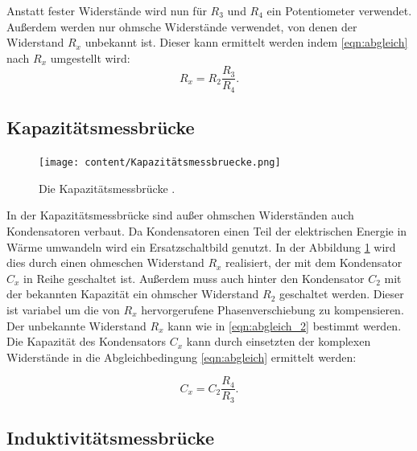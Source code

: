 Anstatt fester Widerstände wird nun für $R_3$ und $R_4$ ein Potentiometer verwendet.
Außerdem werden nur ohmsche Widerstände verwendet, von denen der Widerstand $R_x$ unbekannt ist.
Dieser kann ermittelt werden indem \eqref{eqn:abgleich} nach $R_x$ umgestellt wird:
\begin{equation}
    R_x = R_2 \frac{R_3}{R_4}.
    \label{eqn:abgleich_2}
\end{equation}

\subsection{Kapazitätsmessbrücke}

\begin{figure}
    \centering
    \texttt{[image: content/Kapazitätsmessbruecke.png]}
    \caption{Die Kapazitätsmessbrücke \cite[S. 220]{anleitung}.}
     \label{fig:kapaz}
\end{figure}

In der Kapazitätsmessbrücke sind außer ohmschen Widerständen auch Kondensatoren verbaut.
Da Kondensatoren einen Teil der elektrischen Energie in Wärme umwandeln wird ein Ersatzschaltbild genutzt.
In der Abbildung \ref{fig:kapaz} wird dies durch einen ohmeschen Widerstand $R_x$ realisiert, der mit dem Kondensator $C_x$ in Reihe geschaltet ist.
Außerdem muss auch hinter den Kondensator $C_2$ mit der bekannten Kapazität ein ohmscher Widerstand $R_2$ geschaltet werden.
Dieser ist variabel um die von $R_x$ hervorgerufene Phasenverschiebung zu kompensieren.
Der unbekannte Widerstand $R_x$ kann wie in \eqref{eqn:abgleich_2} bestimmt werden.
Die Kapazität des Kondensators $C_x$ kann durch einsetzten der komplexen Widerstände in die
Abgleichbedingung \eqref{eqn:abgleich} ermittelt werden:

\begin{equation}
C_x = C_2 \frac{R_4}{R_3}.
\end{equation}

\subsection{Induktivitätsmessbrücke}

